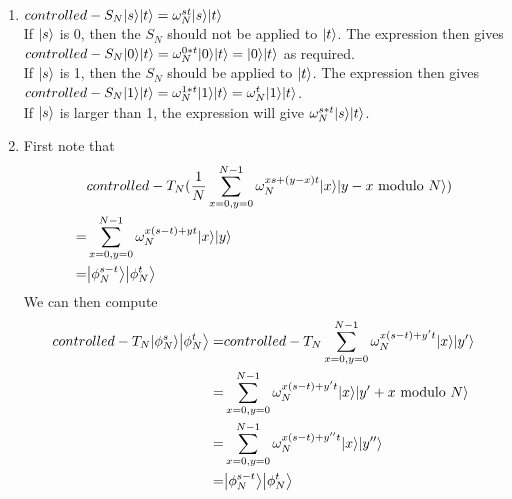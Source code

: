 \documentclass{assignment}
\begin{document}
\begin{problemlist}
  \pbitem
  \begin{problem}
  \end{problem}
  \begin{answer}
    \\
    \begin{enumerate}
    \item
      $controlled-S_N\ket{s}\ket{t}=\omega_N^{st}\ket{s}\ket{t}$\\
      If $\ket{s}$ is 0, then the $S_N$ should not be applied to $\ket{t}$. The expression then gives $controlled-S_N\ket{0}\ket{t}=\omega_N^{0*t}\ket{0}\ket{t}=\ket{0}\ket{t}$ as required.\\
      If $\ket{s}$ is 1, then the $S_N$ should be applied to $\ket{t}$. The expression then gives $controlled-S_N\ket{1}\ket{t}=\omega_N^{1*t}\ket{1}\ket{t}=\omega_N^t\ket{1}\ket{t}$.\\
      If $\ket{s}$ is larger than 1, the expression will give $\omega_N^{s*t}\ket{s}\ket{t}$.\\ 
    \item
      First note that
      \begin{align*}
        &controlled-T_N(\frac{1}{N}\sum_{x=0,y=0}^{N-1}\omega_N^{xs+(y-x)t}\ket{x}\ket{y-x\text{ modulo }N})\\
        =&\sum_{x=0,y=0}^{N-1}\omega_N^{x(s-t)+yt}\ket{x}\ket{y}\\
        =&\ket{\phi_N^{s-t}}\ket{\phi_N^t}
      \end{align*}
      We can then compute
      \begin{align*}
        controlled-T_N\ket{\phi_N^s}\ket{\phi_N^t}=&controlled-T_N\sum_{x=0,y=0}^{N-1}\omega_N^{x(s-t)+y't}\ket{x}\ket{y'}\\
        =&\sum_{x=0,y=0}^{N-1}\omega_N^{x(s-t)+y't}\ket{x}\ket{y'+x\text{ modulo }N}\\
        =&\sum_{x=0,y=0}^{N-1}\omega_N^{x(s-t)+y''t}\ket{x}\ket{y''}\\
        =&\ket{\phi_N^{s-t}}\ket{\phi_N^{t}}
      \end{align*}
    \end{enumerate}
  \end{answer}
  
\end{problemlist}
\end{document}
